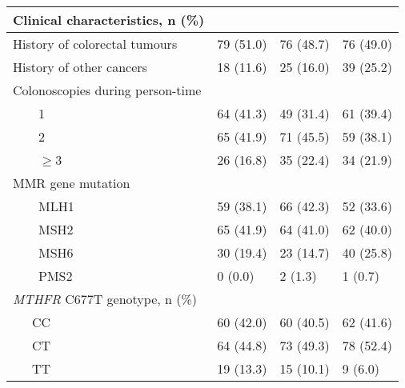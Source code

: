 \begin{flushleft}
\begin{supertabular}{m{4.795cm}m{3.5cm}m{3.5cm}m{3.3cm}}
{\textbf{Clinical
characteristics}}{, n (\%)} &
~
 &
~
 &
~
\\\hline
{History of
colorectal tumours} &
 79 (51.0) &
 76 (48.7) &
 76 (49.0)\\
 History of other cancers &
 18 (11.6) &
 25 (16.0) &
 39 (25.2)\\
 Colonoscopies during person-time &
~
 &
~
 &
~
\\
 \ \ \ \ 1 &
 64 (41.3) &
 49 (31.4) &
 61 (39.4)\\
 \ \ \ \ 2 &
 65 (41.9) &
 71 (45.5) &
 59 (38.1)\\
 \ \ \ \ ${\geq}$3 &
 26 (16.8) &
 35 (22.4) &
{34 (21.9)}\\
 MMR gene mutation &
~
 &
~
 &
~
\\
 \ \ \ \ MLH1 &
 59 (38.1) &
 66 (42.3) &
 52 (33.6)\\
 \ \ \ \ MSH2 \ \  &
 65 (41.9) &
 64 (41.0) &
 62 (40.0)\\
 \ \ \ \ MSH6 &
 30 (19.4) &
 23 (14.7) &
 40 (25.8)\\
 \ \ \ \ PMS2 &
 0 (0.0) &
 2 (1.3) &
 1 (0.7)\\

{\textit{MTHFR}}{
C677T genotype, n (\%)} &
~
 &
~
 &
~
\\
 \ \ \ CC &
 60 (42.0) &
 60 (40.5) &
 62 (41.6)\\
 \ \ \ CT &
 64 (44.8) &
 73 (49.3) &
 78 (52.4)\\
 \ \ \ TT &
 19 (13.3) &
 15 (10.1) &
 9 (6.0)\\\hline
\end{supertabular}
\end{flushleft}



